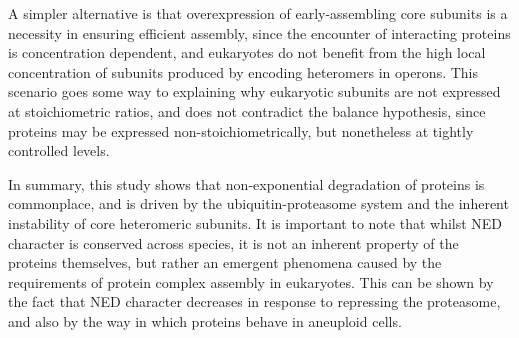 \documentclass[a4paper,11pt,twoside,openright]{scrbook}
\begin{document}
A simpler alternative is that overexpression of early-assembling core subunits
is a necessity in ensuring efficient assembly, since the encounter of
interacting proteins is concentration dependent, and eukaryotes do not benefit
from the high local concentration of subunits produced by encoding heteromers in
operons. This scenario goes some way to explaining why eukaryotic subunits are
not expressed at stoichiometric ratios, and does not contradict the balance
hypothesis, since proteins may be expressed non-stoichiometrically, but
nonetheless at tightly controlled levels.

In summary, this study shows that non-exponential degradation of proteins is
commonplace, and is driven by the ubiquitin-proteasome system and the inherent
instability of core heteromeric subunits. It is important to note that whilst
NED character is conserved across species, it is not an inherent property of the
proteins themselves, but rather an emergent phenomena caused by the requirements
of protein complex assembly in eukaryotes. This can be shown by the fact that
NED character decreases in response to repressing the proteasome, and also by
the way in which proteins behave in aneuploid cells.

\end{document}

